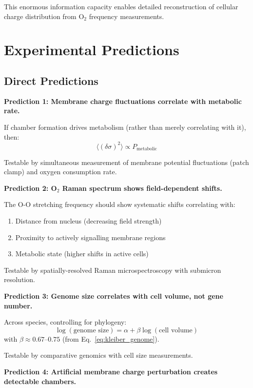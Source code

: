 \documentclass[twocolumn,10pt,aps,prd,superscriptaddress,floatfix,nofootinbib]{revtex4-2}
\theoremstyle{remark}
\begin{document}
This enormous information capacity enables detailed reconstruction of cellular charge distribution from O$_2$ frequency measurements.

\section{Experimental Predictions}
\label{sec:predictions}

\subsection{Direct Predictions}

\textbf{Prediction 1: Membrane charge fluctuations correlate with metabolic rate.}

If chamber formation drives metabolism (rather than merely correlating with it), then:
\begin{equation}
\langle(\delta\sigma)^2\rangle \propto P_{\mathrm{metabolic}}
\end{equation}

Testable by simultaneous measurement of membrane potential fluctuations (patch clamp) and oxygen consumption rate.

\textbf{Prediction 2: O$_2$ Raman spectrum shows field-dependent shifts.}

The O-O stretching frequency should show systematic shifts correlating with:
\begin{enumerate}
\item Distance from nucleus (decreasing field strength)
\item Proximity to actively signalling membrane regions
\item Metabolic state (higher shifts in active cells)
\end{enumerate}

Testable by spatially-resolved Raman microspectroscopy with submicron resolution.

\textbf{Prediction 3: Genome size correlates with cell volume, not gene number.}

Across species, controlling for phylogeny:
\begin{equation}
\log(\text{genome size}) = \alpha + \beta\log(\text{cell volume})
\end{equation}
with $\beta \approx 0.67$--$0.75$ (from Eq.~\eqref{eq:kleiber_genome}).

Testable by comparative genomics with cell size measurements.

\textbf{Prediction 4: Artificial membrane charge perturbation creates detectable chambers.}
\end{document}
